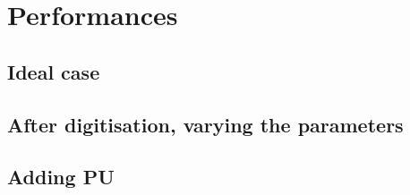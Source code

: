 \section{Performances}
\label{sec:perf}

\subsection{Ideal case}

\subsection{After digitisation, varying the parameters}

\subsection{Adding PU}